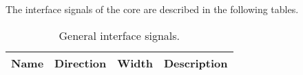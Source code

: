 \label{sec:is}

The interface signals of the core are described in the following tables.

\begin{table}[H]
  \centering
  \begin{tabular}{|l|l|r|p{10.5cm}|}
    
    \hline
    \rowcolor{iob-green}
    {\bf Name} & {\bf Direction} & {\bf Width} & {\bf Description}  \\ \hline \hline

    
 
  \end{tabular}
  \caption{General interface signals.}
  \label{gen_if_tab:is}
\end{table}



